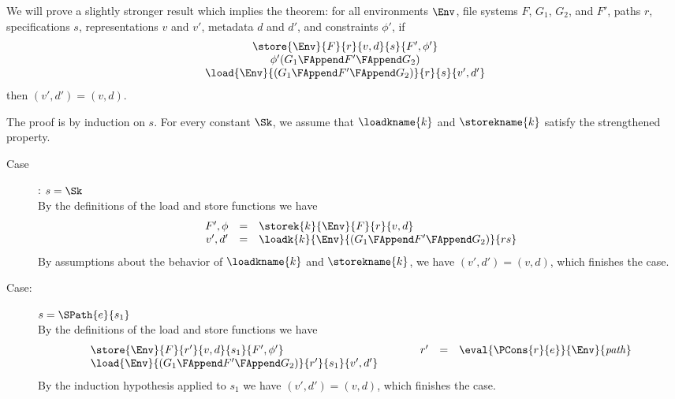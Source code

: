 %
{ We will prove a slightly stronger result which implies the theorem:
  for all environments $\Env$, file systems $F$, $G_1$, $G_2$, and
  $F'$, paths $r$, specifications $s$, representations $v$ and $v'$,
  metadata $d$ and $d'$, and constraints $\phi'$, if 
%
\[
\begin{array}{c}
  \store{\Env}{F}{r}{v,d}{s}{F',\phi'}\\
  \phi'(G_1 \FAppend F' \FAppend G_2)\\
  \load{\Env}{(G_1 \FAppend F' \FAppend G_2)}{r}{s}{v',d'}
\end{array}
\]
%
then $(v',d') = (v,d)$. 

The proof is by induction on $s$. For every constant $\Sk$, we assume
that $\loadkname{k}$ and $\storekname{k}$ satisfy the strengthened
property.
\begin{description}
\item[Case]: $s = \Sk$\\[1ex]
%
By the definitions of the load and store functions we have 
\[ 
\begin{array}{rcll}
F',\phi &=& \storek{k}{\Env}{F}{r}{v,d}\\
v',d'  &=& \loadk{k}{\Env}{(G_1 \FAppend F' \FAppend G_2)}{rs}\\
\end{array}
\]
By assumptions about the behavior of $\loadkname{k}$ and
$\storekname{k}$, we have $(v',d') = (v,d)$, which finishes the case.

\item[Case:] $s=\SPath{e}{s_1}$\\[1ex]
%
By the definitions of the load and store functions we have
\[
\begin{array}{l}
\store{\Env}{F}{r'}{v,d}{s_1}{F',\phi'}\\
\load{\Env}{(G_1 \FAppend F' \FAppend G_2)}{r'}{s_1}{v',d'}
\end{array}\hspace*{1cm}\begin{array}{rcl}
r' &=& \eval{\PCons{r}{e}}{\Env}{\mathit{path}}\\
\\
\end{array}
\]
%
By the induction hypothesis applied to $s_1$ we have $(v',d') =
(v,d)$, which finishes the case.


\end{description}}
